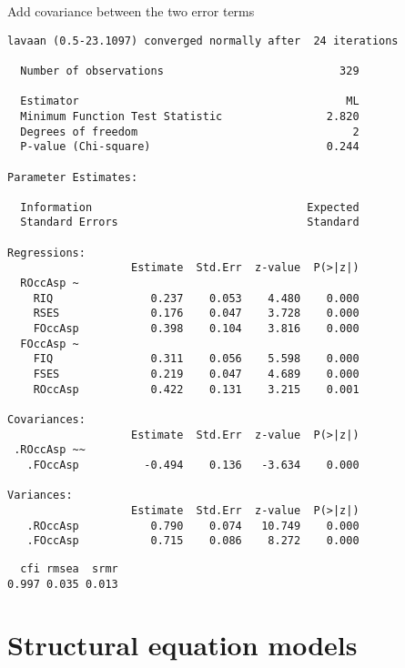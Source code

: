\documentclass[10pt,ignorenonframetext,]{beamer}
\begin{document}
\begin{frame}[fragile]{Add covariance between the two error terms}

\tiny

\begin{verbatim}
lavaan (0.5-23.1097) converged normally after  24 iterations

  Number of observations                           329

  Estimator                                         ML
  Minimum Function Test Statistic                2.820
  Degrees of freedom                                 2
  P-value (Chi-square)                           0.244

Parameter Estimates:

  Information                                 Expected
  Standard Errors                             Standard

Regressions:
                   Estimate  Std.Err  z-value  P(>|z|)
  ROccAsp ~                                           
    RIQ               0.237    0.053    4.480    0.000
    RSES              0.176    0.047    3.728    0.000
    FOccAsp           0.398    0.104    3.816    0.000
  FOccAsp ~                                           
    FIQ               0.311    0.056    5.598    0.000
    FSES              0.219    0.047    4.689    0.000
    ROccAsp           0.422    0.131    3.215    0.001

Covariances:
                   Estimate  Std.Err  z-value  P(>|z|)
 .ROccAsp ~~                                          
   .FOccAsp          -0.494    0.136   -3.634    0.000

Variances:
                   Estimate  Std.Err  z-value  P(>|z|)
   .ROccAsp           0.790    0.074   10.749    0.000
   .FOccAsp           0.715    0.086    8.272    0.000
\end{verbatim}

\begin{verbatim}
  cfi rmsea  srmr 
0.997 0.035 0.013 
\end{verbatim}

\end{frame}

\section{Structural equation models}\label{structural-equation-models}
\end{document}
